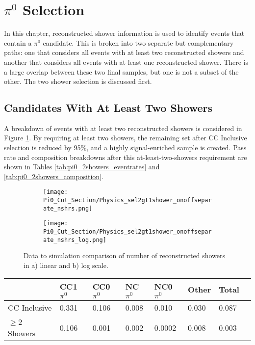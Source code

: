\clearpage
\section{$\pi^0$ Selection} 

In this chapter, reconstructed shower information is used to identify events that contain a $\pi^0$ candidate. This is broken into two separate but complementary paths: one that considers all events with at least two reconstructed showers and another that considers all events with at least one reconstructed shower. There is a large overlap between these two final samples, but one is not a subset of the other. The two shower selection is discussed first.  

\subsection{Candidates With At Least Two Showers}
A breakdown of events with at least two reconstructed showers is considered in Figure \ref{fig:physics_pi0_nshrs}.  By requiring at least two showers, the remaining set after CC Inclusive selection is reduced by 95\%, and a highly signal-enriched sample is created. Pass rate and composition breakdowns after this at-least-two-showers requirement are shown in Tables \ref{tab:pi0_2showers_eventrates} and \ref{tab:pi0_2showers_composition}. 

\begin{figure}[H]
  \begin{subfigure}[t]{0.3\textwidth}
\texttt{[image: Pi0\_Cut\_Section/Physics\_sel2gt1shower\_onoffseparate\_nshrs.png]}
  \caption{ }
  \end{subfigure} 
  \hspace{35mm}
  \begin{subfigure}[t]{0.3\textwidth}
    \texttt{[image: Pi0\_Cut\_Section/Physics\_sel2gt1shower\_onoffseparate\_nshrs\_log.png]}
  \caption{ }
  \end{subfigure} 
\caption{ Data to simulation comparison of number of reconstructed showers in a) linear and b) log scale. }
\label{fig:physics_pi0_nshrs}
\end{figure}

\begin{table}[H]
\centering
{}
 \begin{tabular}{| l | l | l |l|l|l|l|l|}
 \hline
 & CC1$\pi^0$ & CC0$\pi^0$ & NC$\pi^0$ & NC0$\pi^0$ & Other & Total \\ [0.1ex] \hline
CC Inclusive & 0.331 & 0.106 & 0.008 & 0.010 & 0.030 & 0.087 \\
$\geq$2 Showers & 0.106 & 0.001 & 0.002 & 0.0002 & 0.008 & 0.003 \\ \hline
\end{tabular}
\end{table}

